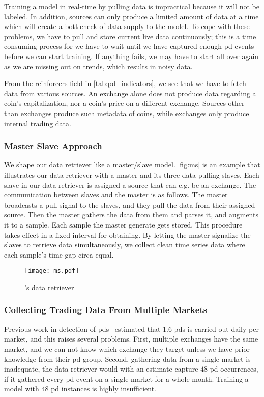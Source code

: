 Training a model in real-time by pulling data is impractical because it will not be labeled. In addition, sources can only produce a limited amount of data at a time which will create a bottleneck of data supply to the model. To cope with these problems, we have to pull and store current live data continuously; this is a time consuming process for we have to wait until we have captured enough \ac{pd} events before we can start training. If anything fails, we may have to start all over again as we are missing out on trends, which results in noisy data.

From the reinforcers field in \autoref{tab:pd_indicators}, we see that we have to fetch data from various sources. An exchange alone does not produce data regarding a coin's capitalization, nor a coin's price on a different exchange. Sources other than exchanges produce such metadata of coins, while exchanges only produce internal trading data.

\subsubsection{Master Slave Approach}
We shape our data retriever like a master/slave model. \autoref{fig:ms} is an example that illustrates our data retriever with a master and its three data-pulling slaves. Each slave in our data retriever is assigned a source that can e.g. be an exchange. The communication between slaves and the master is as follows. The master broadcasts a pull signal to the slaves, and they pull the data from their assigned source. Then the master gathers the data from them and parses it, and augments it to a sample. Each sample the master generate gets stored. This procedure takes effect in a fixed interval for obtaining. By letting the master signalize the slaves to retrieve data simultaneously, we collect clean time series data where each sample's time gap circa equal. 

\begin{figure}[hbt!]
    \centering
    \texttt{[image: ms.pdf]}
    \caption{\project's data retriever}
    \label{fig:ms}
\end{figure}

\subsubsection{Collecting Trading Data From Multiple Markets}
Previous work in detection of \acp{pd}~\cite{P&D_to_the_moon} estimated that $1.6$ \acp{pd} is carried out daily per market, and this raises several problems. First, multiple exchanges have the same market, and we can not know which exchange they target unless we have prior knowledge from their \ac{pd} group. Second, gathering data from a single market is inadequate, the data retriever would with an estimate capture $48$ \ac{pd} occurrences, if it gathered every \ac{pd} event on a single market for a whole month. Training a model with $48$ \ac{pd} instances is highly insufficient. 

